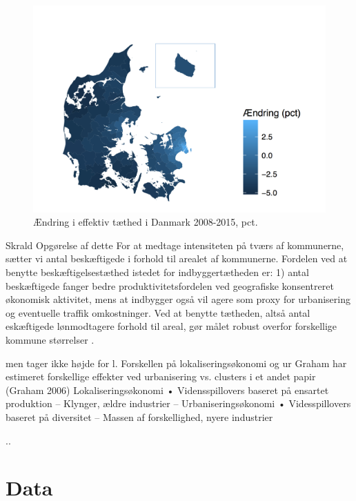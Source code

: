 \documentclass[a4paper, 12pt, titlepage]{article}
\begin{document}
\begin{figure}[tb] 
  \centering
  \includegraphics[width=\textwidth]{andring.pdf}
  \caption{Ændring i effektiv tæthed i Danmark 2008-2015, pct.}
  \label{fig:aendring}
\end{figure}

  
  
  Skrald
  Opgørelse af dette For at medtage intensiteten på tværs af kommunerne, sætter vi antal beskæftigede i forhold til arealet af kommunerne. Fordelen ved at benytte beskæftigelsestæthed istedet for indbyggertætheden er: 1) antal beskæftigede fanger bedre produktivitetsfordelen ved geografiske konsentreret økonomisk aktivitet, mens at indbygger også vil agere som proxy for urbanisering og eventuelle traffik omkostninger. Ved at benytte tætheden, altså antal eskæftigede lønmodtagere forhold til areal, gør målet robust overfor forskellige kommune størrelser \cite[pp. 335.]{melo2009meta}.
 
men tager ikke højde for l. Forskellen på lokaliseringsøkonomi og ur
Graham har estimeret forskellige effekter ved urbanisering vs. clusters i et andet papir (Graham 2006)  
 Lokaliseringsøkonomi
• Vidensspillovers baseret på ensartet produktion
– Klynger, ældre industrier – Urbaniseringsøkonomi
• Videsspillovers baseret på diversitet
– Massen af forskellighed, nyere industrier



..


 
 


\section{Data}
\end{document}
